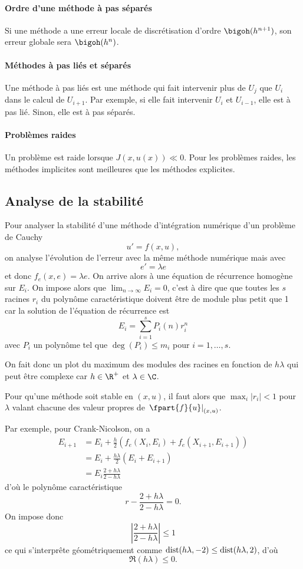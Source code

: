 \paragraph{Ordre d'une méthode à pas séparés}
Si une méthode a une erreur locale de discrétisation d'ordre
$\bigoh(h^{n+1})$, son erreur globale sera $\bigoh(h^n)$.

\paragraph{Méthodes à pas liés et séparés}
Une méthode à pas liés est une méthode qui fait intervenir
plus de $U_j$ que $U_i$ dans le calcul de $U_{i+1}$.
Par exemple, si elle fait intervenir $U_i$ et $U_{i-1}$, elle
est à pas lié.
Sinon, elle est à pas séparés.

\paragraph{Problèmes raides}
Un problème est raide lorsque $J(x, u(x)) \ll 0$.
Pour les problèmes raides, les méthodes implicites sont meilleures que les
méthodes explicites.

\subsection{Analyse de la stabilité}
Pour analyser la stabilité d'une méthode d'intégration numérique d'un
problème de Cauchy
\[ u' = f(x, u), \]
on analyse l'évolution de l'erreur avec la même méthode
numérique mais avec
\[ e' = \lambda e \]
et donc $f_e(x, e) = \lambda e$.
On arrive alors à une équation de récurrence homogène sur $E_i$.
On impose alors que $\lim_{n \to \infty} E_i = 0$, c'est à dire que
que toutes les $s$ racines $r_i$ du polynôme caractéristique doivent être de module plus petit que 1
car la solution de l'équation de récurrence est
\[ E_i = \sum_{i = 1}^s P_i(n)r_i^n \]
avec $P_i$ un polynôme tel que
$\deg(P_i) \leq m_i$ pour $i = 1, \ldots, s$.

On fait donc un plot du maximum des modules des racines en fonction de $h\lambda$ qui peut
être complexe car $h \in \R^+$ et $\lambda \in \C$.

Pour qu'une méthode soit stable en $(x, u)$,
il faut alors que $\max_i |r_i| < 1$ pour
$\lambda$ valant chacune des valeur
propres de $\left.\fpart{f}{u}\right|_{(x,u)}$.

\begin{myexem}
  Par exemple, pour Crank-Nicolson, on a
  \begin{align*}
    E_{i+1} & = E_i + \frac{h}{2} (f_e(X_i, E_i) + f_e(X_{i+1}, E_{i+1}))\\
            & = E_i + \frac{h\lambda}{2} (E_i + E_{i+1})\\
            & = E_i \frac{2 + h\lambda}{2 - h\lambda}
  \end{align*}
  d'où le polynôme caractéristique
  \[ r - \frac{2 + h\lambda}{2 - h\lambda} = 0. \]
  On impose donc
  \[ \left|\frac{2 + h\lambda}{2 - h\lambda}\right| \leq 1 \]
  ce qui s'interprête géométriquement comme
  $\operatorname{dist}(h\lambda, -2) \leq \operatorname{dist}(h\lambda, 2)$, d'où
  \[ \Re(h\lambda) \leq 0. \]
\end{myexem}


